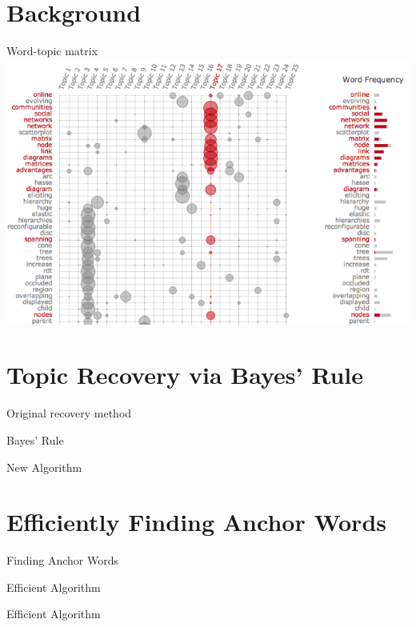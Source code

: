 \documentclass{lecture}
\begin{document}
\section[Background]{Background}
\begin{plain}{Word-topic matrix}
	\includegraphics[scale=0.4]{word_topic}
\end{plain}

\section[Topic Recovery]{Topic Recovery via Bayes' Rule}
\begin{plain}{Original recovery method}
\end{plain}

\begin{plain}{Bayes' Rule}
\end{plain}

\begin{plain}{New Algorithm}
\end{plain}


\section[Anchor Words]{Efficiently Finding Anchor Words}
\begin{plain}{Finding Anchor Words}
\end{plain}

\begin{plain}{Efficient Algorithm}
\end{plain}
\begin{plain}{Efficient Algorithm}
\end{plain}
\end{document}
